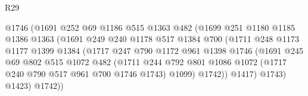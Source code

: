 \begin{lexlean}{R29}
\begin{coremodule}
                                  @1746
                                  (@1691
                                    @252
                                    @69
                                    @1186
                                    @515
                                    @1363
                                    @482
                                    (@1699
                                      @251
                                      @1180
                                      @1185
                                      @1386
                                      @1363
                                      (@1691
                                        @249
                                        @240
                                        @1178
                                        @517
                                        @1384
                                        @700
                                        (@1711
                                          @248
                                          @1173
                                          @1177
                                          @1399
                                          @1384
                                          (@1717
                                            @247
                                            @790
                                            @1172
                                            @961
                                            @1398
                                            @1746
                                            (@1691
                                              @245
                                              @69
                                              @802
                                              @515
                                              @1072
                                              @482
                                              (@1711
                                                @244
                                                @792
                                                @801
                                                @1086
                                                @1072
                                                (@1717 @240 @790 @517 @961 @700 @1746 @1743)
                                                @1099)
                                              @1742))
                                          @1417)
                                        @1743)
                                      @1423)
                                    @1742))

\end{coremodule}
\end{lexlean}

